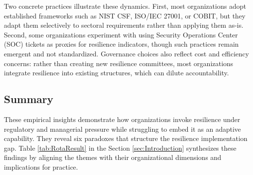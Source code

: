 Two concrete practices illustrate these dynamics. First, most organizations adopt established frameworks such as NIST CSF, ISO/IEC 27001, or COBIT, but they adapt them selectively to sectoral requirements rather than applying them as-is. Second, some organizations experiment with using Security Operations Center (SOC) tickets as proxies for resilience indicators, though such practices remain emergent and not standardized. Governance choices also reflect cost and efficiency concerns: rather than creating new resilience committees, most organizations integrate resilience into existing structures, which can dilute accountability.

\subsection{Summary}
These empirical insights demonstrate how organizations invoke resilience under regulatory and managerial pressure while struggling to embed it as an adaptive capability. They reveal six paradoxes that structure the resilience implementation gap. Table \ref{tab:RotaResult} in the Section \ref{sec:Introduction} synthesizes these findings by aligning the themes with their organizational dimensions and implications for practice.